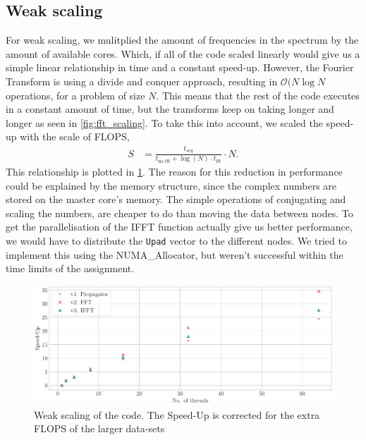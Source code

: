 \documentclass{article}
\begin{document}
\subsection{Weak scaling}
For weak scaling, we mulitplied the amount of frequencies in the spectrum by the amount of available cores. Which, if all of the code scaled linearly would give us a simple linear relationship in time and a constant speed-up. However, the Fourier Transform is using a divide and conquer approach, resulting in $\mathcal{O}(N\log N$ operations, for a problem of size $N$. This means that the rest of the code executes in a constant amount of time, but the transforms keep on taking longer and longer as seen in \cref{fig:fft_scaling}. To take this into account, we scaled the speed-up with the scale of FLOPS,
\begin{align}
    S &= \frac{t_{seq}}{t_\text{no fft} + \log(N) \cdot t_\text{fft}} \cdot N.
\end{align}
This relationship is plotted in \cref{fig:weak}.
The reason for this reduction in performance could be explained by the memory structure, since the complex numbers are stored on the master core's memory. The simple operations of conjugating and scaling the numbers, are cheaper to do than moving the data between nodes. To get the parallelisation of the IFFT function actually give us better performance, we would have to distribute the \texttt{Upad} vector to the different nodes. We tried to implement this using the NUMA\_Allocator, but weren't successful within the time limits of the assignment.
\begin{figure}
    \centering
    \includegraphics[width=\textwidth]{./figures/weak_scaling_corrected.pdf}
    \caption{Weak scaling of the code. The Speed-Up is corrected for the extra FLOPS of the larger data-sets}
    \label{fig:weak}
\end{figure}
\end{document}
